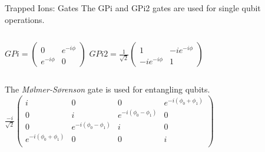 \documentclass{beamer}
\begin{document}
\begin{frame}{Trapped Ions: Gates}
The GPi and GPi2 gates are used for single qubit operations.\vfill
    \begin{columns}
        \begin{math}
            GPi = \begin{pmatrix}
                0 & e^{-i\phi} \\
                e^{-i\phi} & 0
            \end{pmatrix}
        \end{math}
        \begin{math}
            GPi2 = \frac{1}{\sqrt{2}}\begin{pmatrix}
                1 & -ie^{-i\phi} \\
                -ie^{-i\phi} & 1
            \end{pmatrix}
        \end{math}
    \end{columns}\vfill
    \centering
    The \emph{Mølmer-Sørenson} gate is used for entangling qubits.\vfill
    \begin{math}
        \frac{-i}{\sqrt{2}}
        \begin{pmatrix}
            i & 0 & 0 & e^{-i(\phi_0+\phi_1)}\\
            0 & i & e^{-i(\phi_0-\phi_1)} & 0\\
            0 & e^{-i(\phi_0-\phi_1)} & i & 0\\
            e^{-i(\phi_0+\phi_1)} & 0 & 0 & i\\
        \end{pmatrix}
    \end{math}
\end{frame}
\end{document}
